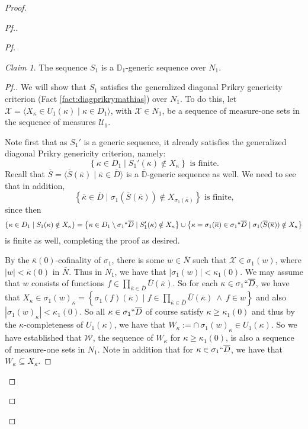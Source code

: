 \documentclass{amsart}
\theoremstyle{definition}
\theoremstyle{remark}
\newtheorem{claimno}{Claim}
\newcommand{\D}{\mathbb{D}}
\newcommand{\N}{{\overline{N}}}
\renewcommand{\S}{{\overline{S}}}
\newcommand{\U}{\mathcal{U}}
\newcommand{\st}{\; | \;}
\newcommand{\set}[2]{\left\{#1\st #2 \right\}}
\newcommand{\seq}[2]{\langle #1 \st #2 \rangle}
\begin{document}
\begin{proof}
\begin{proof}[Pf.]
\begin{proof}[Pf]
\begin{claimno} \label{Claim:S_1isPrikryoverN_1} The sequence $S_1$ is a $\D_1$-generic sequence over $N_1$. \end{claimno}
\begin{proof}[Pf.]
We will show that $S_1$ satisfies the generalized diagonal Prikry genericity criterion (Fact \ref{fact:diagprikrymathias}) over $N_1$. To do this, let $\mathcal X = \seq{ X_\kappa \in U_1(\kappa) }{ \kappa \in D_1 }$, with $\mathcal X \in N_1$, be a sequence of measure-one sets in the sequence of measures $\U_1$.

Note first that as $S_1'$ is a generic sequence, it already satisfies the generalized diagonal Prikry genericity criterion, namely:
$$\set{ \kappa \in D_1}{ S_1'(\kappa) \notin X_\kappa } \text{ is finite.}$$
Recall that $\S = \seq{ \S(\overline \kappa) }{ \overline \kappa \in \overline D }$ is a $\overline{\D}$-generic sequence as well.
We need to see that in addition,
$$\set{ \overline \kappa \in \overline D}{\sigma_1(\S(\overline \kappa)) \notin X_{\sigma_1(\overline \kappa)} }  \text{ is finite,}$$
since then 
$$\set{ \kappa \in D_1}{ S_1(\kappa) \notin X_\kappa } = \set{ \kappa \in D_1 \setminus \sigma_1``\overline D}{ S_1'(\kappa) \notin X_\kappa } \cup \set{ \kappa = \sigma_1(\overline \kappa) \in \sigma_1``\overline D}{\sigma_1(\S(\overline \kappa)) \notin X_\kappa }$$
is finite as well, completing the proof as desired.

By the $\overline{\kappa}(0)$-cofinality of $\sigma_1$, there is some $w \in \N$ such that $\mathcal X \in \sigma_1(w)$, where $|w| < \overline{\kappa}(0)$ in $\N$. Thus in $N_1$, we have that $|\sigma_1(w)| < \kappa_1(0)$. 
We may assume that $w$ consists of functions $f \in \prod_{\overline \kappa \in \overline D} \overline U(\overline \kappa)$.
So for each $\kappa \in \sigma_1``\overline D$, we have that $X_\kappa \in \sigma_1(w)_\kappa = \set{\sigma_1(f)(\overline \kappa) }{ f \in \prod_{\overline \kappa \in \overline D} \overline U(\overline \kappa) \ \land \ f \in w }$ and also $|\sigma_1(w)_\kappa|<\kappa_1(0).$ So all $\kappa \in \sigma_1``\overline D$ of course satisfy $\kappa \geq \kappa_1(0)$ and thus by the $\kappa$-completeness of $U_1(\kappa)$, we have that $W_\kappa := \cap \, \sigma_1(w)_\kappa \in  U_1(\kappa).$
So we have established that $\mathcal W$, the sequence of $W_\kappa$ for $\kappa \geq \kappa_1(0)$, is also a sequence of measure-one sets in $N_1$. Note in addition that for $\kappa \in \sigma_1``\overline D$, we have that $W_\kappa \subseteq X_\kappa$. 


\end{proof}
\end{proof}
\end{proof}
\end{proof}
\end{document}
